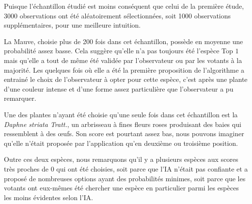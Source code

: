 \documentclass[a4paper,12pt]{article}
\begin{document}
Puisque l'échantillon étudié est moins conséquent que celui de la première étude, 3000 observations ont été aléatoirement sélectionnées, soit 1000 observations supplémentaires, pour une meilleure intuition. 

\vspace{0.2cm}

La Mauve, choisie plus de 200 fois dans cet échantillon, possède en moyenne une probabilité assez basse. Cela suggère qu'elle n'a pas toujours été l'espèce Top $1$ mais qu'elle a tout de même été validée par l'observateur ou par les votants à la majorité. Les quelques fois où elle a été la première proposition de l'algorithme a entrainé le choix de l'observateur à opter pour cette espèce, c'est après une plante d'une couleur intense et d'une forme assez particulière que l'observateur a pu remarquer.

\vspace{0.2cm}

Une des plantes n'ayant été choisie qu'une seule fois dans cet échantillon est la \textit{Daphne striata Tratt.}, un arbrisseau à fines fleurs roses produisant des baies qui ressemblent à des œufs. Son score est pourtant assez bas, nous pouvons imaginer qu'elle n'était proposée par l'application qu'en deuxième ou troisième position.  

\vspace{0.2cm}

Outre ces deux espèces, nous remarquons qu'il y a plusieurs espèces aux scores très proches de $0$ qui ont été choisies, soit parce que l'IA n'était pas confiante et a proposé de nombreuses options ayant des probabilités minimes, soit parce que les votants ont eux-mêmes été chercher une espèce en particulier parmi les espèces les moins évidentes selon l'IA.

\end{document}
